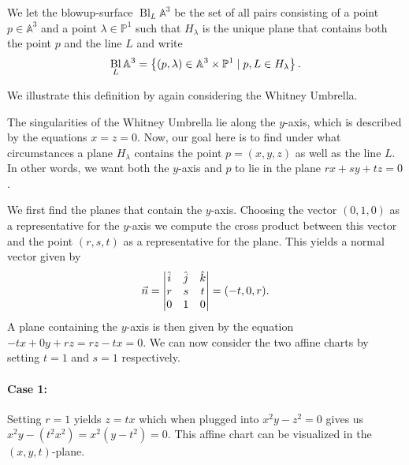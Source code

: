 \documentclass{article}
\newcommand{\A}{\ensuremath{\mathbb{A}}}
\renewcommand{\P}{\ensuremath{\mathbb{P}}}
\DeclareMathOperator{\Bl}{Bl}
\begin{document}
    \begin{definition}[Blowup of $\A^3$ at a line $L$]
        We let the blowup-surface $\Bl_L\A^3$ be the set of all pairs
        consisting of a point $p \in \A^3$ and a point $\lambda \in \P^1$ such
        that $H_\lambda$ is the unique plane that contains both the point $p$
        and the line $L$ and write
        \begin{equation}
            \notag
            \Bl_L\A^3 = \left\{ (p, \lambda) \in \A^3 \times \P^1 \mid p, L \in H_\lambda \right\}.
        \end{equation}
    \end{definition}

    We illustrate this definition by again considering the Whitney Umbrella.
    \begin{example}
        The singularities of the Whitney Umbrella lie along the $y$-axis, which
        is described by the equations $x = z = 0$. Now, our goal here is to
        find under what circumstances a plane $H_\lambda$ contains the point $p
        = (x, y, z)$ as well as the line $L$. In other words, we want both the
        $y$-axis and $p$ to lie in the plane $rx + sy + tz = 0$.
    
        We first find the planes that contain the $y$-axis. Choosing the vector
        $(0, 1, 0)$ as a representative for the $y$-axis we compute the cross
        product between this vector and the point $(r, s, t)$ as a
        representative for the plane.  This yields a normal vector given by
        \begin{equation}
            \notag
            \vec{n} = \begin{vmatrix}
                \hat{i} & \hat{j} & \hat{k} \\
                r & s & t \\
                0 & 1 & 0
            \end{vmatrix} = (-t, 0, r).
        \end{equation}
        A plane containing the $y$-axis is then given by the equation $-tx + 0y
        + rz = rz - tx = 0$. We can now consider the two affine charts by
        setting $t = 1$ and $s = 1$ respectively.

        \paragraph{Case 1:} 
        \label{par:case_1_}
        Setting $r = 1$ yields $z = tx$ which when plugged into $x^2y - z^2 = 0$
        gives us $x^2y - (t^2x^2) = x^2(y - t^2) = 0$. This affine chart can be
        visualized in the $(x, y, t)$-plane.


\end{example}
\end{document}

